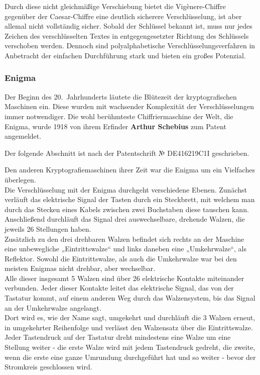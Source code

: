 
Durch diese nicht gleichmäßige Verschiebung bietet die Vigènere-Chiffre gegenüber der Caesar-Chiffre eine deutlich sicherere Verschlüsselung, ist aber allemal nicht vollständig sicher.
Sobald der Schlüssel bekannt ist, muss nur jedes Zeichen des verschlüsselten Textes in entgegengesetzter Richtung des Schlüssels verschoben werden.
Dennoch sind polyalphabetische Verschlüsselungsverfahren in Anbetracht der einfachen Durchführung stark und bieten ein großes Potenzial.

\subsubsection{Enigma}\label{subsubsec:enigma}
Der Beginn des 20.\ Jahrhunderts läutete die Blütezeit der kryptografischen Maschinen ein.
Diese wurden mit wachsender Komplexität der Verschlüsselungen immer notwendiger.
Die wohl berühmteste Chiffriermaschine der Welt, die Enigma, wurde 1918 von ihrem Erfinder \textbf{Arthur Schebius} zum Patent angemeldet\autocite{enigma_patent}.

Der folgende Abschnitt ist nach der Patentschrift № DE\nobreakdash416219C1\nobreakdash\RN{1}\autocite{enigma_patent} geschrieben.

Den anderen Kryptografiemaschinen ihrer Zeit war die Enigma um ein Vielfaches überlegen.\\
Die Verschlüsselung mit der Enigma durchgeht verschiedene Ebenen.
Zunächst verläuft das elektrische Signal der Tasten durch ein Steckbrett, mit welchem man durch das Stecken eines Kabels zwischen zwei Buchstaben diese tauschen kann.
Anschließend durchläuft das Signal drei auswechselbare, drehende Walzen, die jeweils 26 Stellungen haben.\\
Zusätzlich zu den drei drehbaren Walzen befindet sich rechts an der Maschine eine unbewegliche „Eintrittswalze“ und links daneben eine „Umkehrwalze“, als Reflektor.
Sowohl die Eintrittswalze, als auch die Umkehrwalze war bei den meisten Enigmas nicht drehbar, aber wechselbar.\\
Alle dieser insgesamt 5 Walzen sind über 26 elektrische Kontakte miteinander verbunden.
Jeder dieser Kontakte leitet das elektrische Signal, das von der Tastatur kommt, auf einem anderen Weg durch das Walzensystem, bis das Signal an der Umkehrwalze angelangt.\\
Dort wird es, wie der Name sagt, umgekehrt und durchläuft die 3 Walzen erneut, in umgekehrter Reihenfolge und verlässt den Walzensatz über die Eintrittswalze.
Jeder Tastendruck auf der Tastatur dreht mindestens eine Walze um eine Stellung weiter - die erste Walze wird mit jedem Tastendruck gedreht, die zweite, wenn die erste eine ganze Umrundung durchgeführt hat und so weiter - bevor der Stromkreis geschlossen wird.\autocite[]{enigma_patent}


